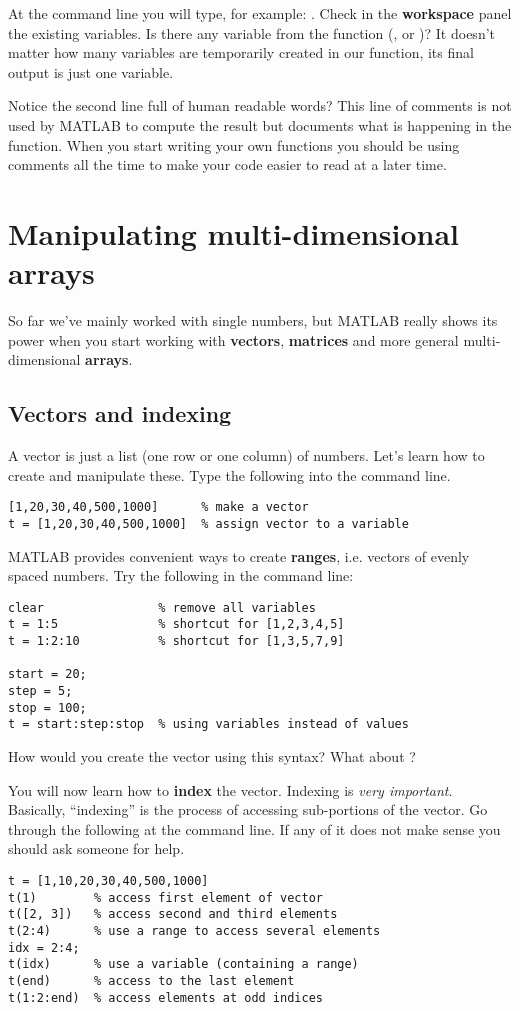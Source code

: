 \documentclass{article}
\begin{document}
At the command line you will type, for example: .
Check in the \textbf{workspace} panel the existing variables.
Is there any variable from the function (,  or )?
It doesn't matter how many variables are temporarily created in our function, its final output is just one variable.

Notice the second line full of human readable words?
This line of comments is not used by MATLAB to compute the result but documents what is happening in the function.
When you start writing your own functions you should be using comments all the time to make your code easier to read at a later time.


\section{Manipulating multi-dimensional arrays}

So far we've mainly worked with single numbers, but MATLAB really shows its power when you start working with \textbf{vectors}, \textbf{matrices} and more general multi-dimensional \textbf{arrays}.

\subsection*{Vectors and indexing}

A vector is just a list (one row or one column) of numbers.
Let's learn how to create and manipulate these.
Type the following into the command line.
\begin{lstlisting}
[1,20,30,40,500,1000]      % make a vector
t = [1,20,30,40,500,1000]  % assign vector to a variable
\end{lstlisting}

MATLAB provides convenient ways to create \textbf{ranges}, i.e. vectors of evenly spaced numbers.
Try the following in the command line:
\begin{lstlisting}
clear                % remove all variables
t = 1:5              % shortcut for [1,2,3,4,5]
t = 1:2:10           % shortcut for [1,3,5,7,9]

start = 20;
step = 5;
stop = 100;
t = start:step:stop  % using variables instead of values
\end{lstlisting}
How would you create the vector \mcode{[5,8,11,14]} using this syntax? What about \mcode{[-1,-2,-3,-4]}?

You will now learn how to \textbf{index} the vector.
Indexing is \emph{very important}.
Basically, ``indexing'' is the process of accessing sub-portions of the vector.
Go through the following at the command line.
If any of it does not make sense you should ask someone for help.
\begin{lstlisting}
t = [1,10,20,30,40,500,1000]
t(1)        % access first element of vector
t([2, 3])   % access second and third elements
t(2:4)      % use a range to access several elements
idx = 2:4;
t(idx)      % use a variable (containing a range)
t(end)      % access to the last element
t(1:2:end)  % access elements at odd indices
\end{lstlisting}
\end{document}
